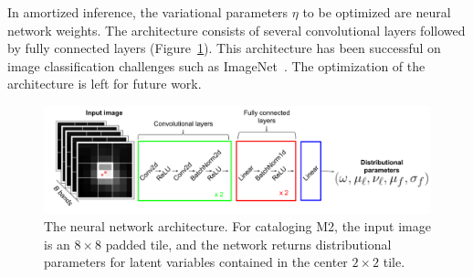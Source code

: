In amortized inference, the variational parameters $\eta$ to be optimized are neural network weights.
The architecture consists of several convolutional layers followed by fully connected layers (Figure~\ref{fig:starnet_arch}). 
This architecture has been successful on image classification challenges such as ImageNet~\citep{imagenet2015}. 
The optimization of the architecture is left for future work. 



\begin{figure}[!tb]
    \centering
    \includegraphics[width=\textwidth]{figures/vi_figures/starnet_archetecture4.png}
    \vspace{-1.25cm}
    \caption{The neural network architecture. For cataloging M2, the input image is an $8\times 8$ padded tile, and the network returns distributional parameters for latent variables contained in the center $2\times 2$ tile.
    }
    \label{fig:starnet_arch}
\end{figure}



